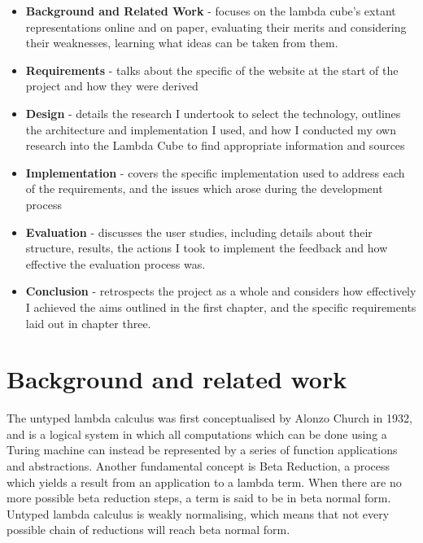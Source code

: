 \documentclass{l4proj}
\begin{document}
\begin{itemize}
    \item
    \textbf{Background and Related Work} - focuses on the lambda cube's extant representations online and on paper,  evaluating their merits and considering their weaknesses, learning what ideas can be taken from them.
    \item
    \textbf{Requirements} - talks about the specific  of the website at the start of the project and how they were derived
    \item
    \textbf{Design} - details the research I undertook to select the technology, outlines the architecture and implementation I used, and how I conducted my own research into the Lambda Cube to find appropriate information and sources
    \item
    \textbf{Implementation} - covers the specific implementation used to address each of the requirements, and the issues which arose during the development process
    \item
    \textbf{Evaluation} - discusses the user studies, including details about their structure, results, the actions I took to implement the feedback and how effective the evaluation process was.
    \item
    \textbf{Conclusion} - retrospects the project as a whole and considers how effectively I achieved the aims outlined in the first chapter, and the specific requirements laid out in chapter three.
    
\end{itemize}

\chapter{Background and related work}

The untyped lambda calculus was first conceptualised by Alonzo Church in 1932, and is a logical system in which all computations which can be done using a Turing machine can instead be represented by a series of function applications and abstractions.  Another fundamental concept is Beta Reduction, a process which yields a result from an application to a lambda term.  When there are no more possible beta reduction steps, a term is said to be in beta normal form.  Untyped lambda calculus is weakly normalising, which means that not every possible chain of reductions will reach beta normal form.
\end{document}
